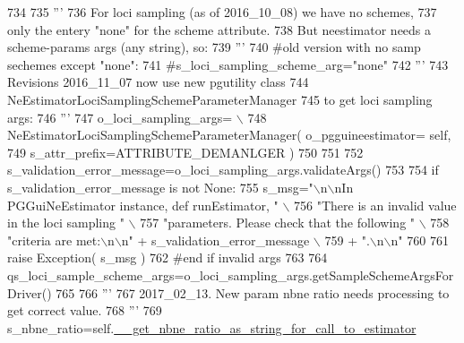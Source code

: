 \begin{DoxyCode}
734 
735         \textcolor{stringliteral}{'''}
736 \textcolor{stringliteral}{        For loci sampling (as of 2016\_10\_08) we have no schemes,}
737 \textcolor{stringliteral}{        only the entery "none" for the scheme attribute.}
738 \textcolor{stringliteral}{        But neestimator needs a scheme-params args (any string), so:}
739 \textcolor{stringliteral}{        '''}
740         \textcolor{comment}{#old version with no samp sechemes except "none":}
741         \textcolor{comment}{#s\_loci\_sampling\_scheme\_arg="none"}
742         \textcolor{stringliteral}{'''}
743 \textcolor{stringliteral}{        Revisions 2016\_11\_07 now use new pgutility class }
744 \textcolor{stringliteral}{        NeEstimatorLociSamplingSchemeParameterManager}
745 \textcolor{stringliteral}{        to get loci sampling args:}
746 \textcolor{stringliteral}{        '''}
747         o\_loci\_sampling\_args= \(\backslash\)
748                 NeEstimatorLociSamplingSchemeParameterManager( o\_pgguineestimator= self,
749                                                                 s\_attr\_prefix=ATTRIBUTE\_DEMANLGER )
750 
751         
752         s\_validation\_error\_message=o\_loci\_sampling\_args.validateArgs()
753 
754         \textcolor{keywordflow}{if} s\_validation\_error\_message \textcolor{keywordflow}{is} \textcolor{keywordflow}{not} \textcolor{keywordtype}{None}:
755             s\_msg=\textcolor{stringliteral}{"\(\backslash\)n\(\backslash\)nIn PGGuiNeEstimator instance, def runEstimator, "} \(\backslash\)
756                     \textcolor{stringliteral}{"There is an invalid value in the loci sampling "} \(\backslash\)
757                     \textcolor{stringliteral}{"parameters.  Please check that the following "} \(\backslash\)
758                     \textcolor{stringliteral}{"criteria are met:\(\backslash\)n\(\backslash\)n"} + s\_validation\_error\_message \(\backslash\)
759                     + \textcolor{stringliteral}{".\(\backslash\)n\(\backslash\)n"}
760         
761             \textcolor{keywordflow}{raise} Exception( s\_msg )
762         \textcolor{comment}{#end if invalid args}
763 
764         qs\_loci\_sample\_scheme\_args=o\_loci\_sampling\_args.getSampleSchemeArgsForDriver()
765 
766         \textcolor{stringliteral}{'''}
767 \textcolor{stringliteral}{        2017\_02\_13. New param nbne ratio needs processing to get correct value.}
768 \textcolor{stringliteral}{        '''}
769         s\_nbne\_ratio=self.\hyperlink{classnegui_1_1pgguineestimator_1_1PGGuiNeEstimator_adb9ab48883c72bc7315ac009bc70c300}{\_\_get\_nbne\_ratio\_as\_string\_for\_call\_to\_estimator}

\end{DoxyCode}
